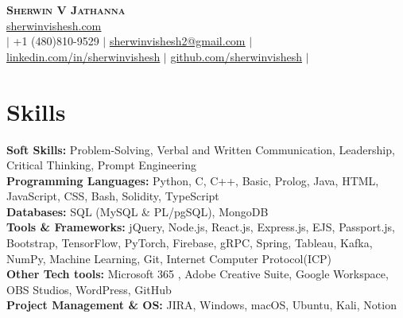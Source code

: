 \documentclass[letterpaper,11pt]{article}
\begin{document}

\begin{center}
    \textbf{\Huge \scshape Sherwin V Jathanna} \\ \vspace{1pt}
     \href{https://sherwinvishesh.com}{\underline{sherwinvishesh.com}} 
   \\ \small $|$ +1 (480)810-9529 $|$ \href{mailto:sherwinvishesh2@gmail.com}{\underline{sherwinvishesh2@gmail.com}} $|$ 
    \href{https://linkedin.com/in/sherwinvishesh}{\underline{linkedin.com/in/sherwinvishesh}} $|$
    \href{https://github.com/sherwinvishesh}{\underline{github.com/sherwinvishesh}} $|$
     \\ 
\end{center}


\section{Skills}
 \begin{itemize}[leftmargin=0.15in, label={}]
    \small{\item{
    \textbf{Soft Skills:}{ Problem-Solving, Verbal and Written Communication, Leadership, Critical Thinking, Prompt Engineering} \\
     \textbf{Programming Languages:}{ Python, C, C++, Basic, Prolog, Java, HTML, JavaScript, CSS,  Bash, Solidity, TypeScript} \\
     \textbf{Databases:}{ SQL (MySQL \& PL/pgSQL), MongoDB} \\
     \textbf{Tools \& Frameworks:}{ jQuery, Node.js, React.js, Express.js, EJS, Passport.js, Bootstrap, TensorFlow, PyTorch, Firebase, gRPC, Spring, Tableau, Kafka, NumPy, Machine Learning, Git,  Internet Computer Protocol(ICP) } \\
     \textbf{Other Tech tools:}{ Microsoft 365 , Adobe Creative Suite, Google Workspace, OBS Studios, WordPress, GitHub } \\
     \textbf{Project Management \& OS: }{ JIRA, Windows, macOS, Ubuntu, Kali, Notion}
    }}
 \end{itemize}
\end{document}

